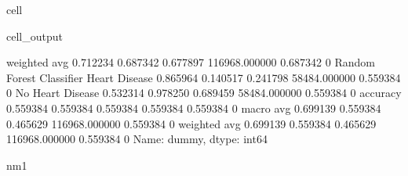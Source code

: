 \documentclass[letterpaper,10pt,english]{jupyterBook}
\begin{document}
\begin{sphinxuseclass}{cell}
\begin{sphinxVerbatimOutput}
\begin{sphinxuseclass}{cell_output}
\begin{sphinxVerbatim}[commandchars=\\\{\}]
                           weighted avg      0.712234   0.687342  0.677897  116968.000000  0.687342    0
Random Forest Classifier   Heart Disease     0.865964   0.140517  0.241798  58484.000000   0.559384    0
                           No Heart Disease  0.532314   0.978250  0.689459  58484.000000   0.559384    0
                           accuracy          0.559384   0.559384  0.559384  0.559384       0.559384    0
                           macro avg         0.699139   0.559384  0.465629  116968.000000  0.559384    0
                           weighted avg      0.699139   0.559384  0.465629  116968.000000  0.559384    0
Name: dummy, dtype: int64

nm1
\PYGZhy{}\PYGZhy{}\PYGZhy{}\PYGZhy{}\PYGZhy{}\PYGZhy{}\PYGZhy{}\PYGZhy{}\PYGZhy{}\PYGZhy{}\PYGZhy{}\PYGZhy{}\PYGZhy{}\PYGZhy{}\PYGZhy{}\PYGZhy{}\PYGZhy{}\PYGZhy{}\PYGZhy{}
\end{sphinxVerbatim}

\noindent{}


\end{sphinxuseclass}
\end{sphinxVerbatimOutput}
\end{sphinxuseclass}
\end{document}
